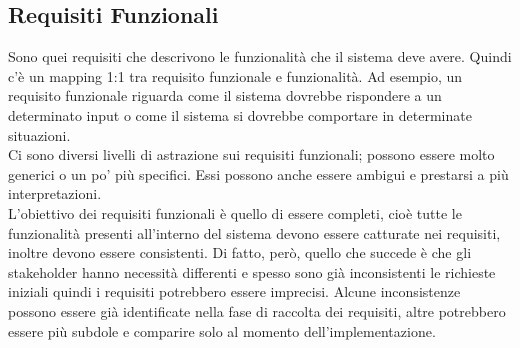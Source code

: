\subsection{Requisiti Funzionali}
Sono quei requisiti che descrivono le funzionalità che il sistema deve avere.
Quindi c'è un mapping 1:1 tra requisito funzionale e funzionalità.
Ad esempio, un requisito funzionale riguarda come il sistema dovrebbe rispondere a un determinato input o come il sistema si dovrebbe comportare in determinate situazioni.\\
Ci sono diversi livelli di astrazione sui requisiti funzionali; possono essere molto generici o un po' più specifici.
Essi possono anche essere ambigui e prestarsi a più interpretazioni.\\
L'obiettivo dei requisiti funzionali è quello di essere completi, cioè tutte le funzionalità presenti all'interno del sistema devono essere catturate nei requisiti, inoltre devono essere consistenti.
Di fatto, però, quello che succede è che gli stakeholder hanno necessità differenti e spesso sono già inconsistenti le richieste iniziali quindi i requisiti potrebbero essere imprecisi.
Alcune inconsistenze possono essere già identificate nella fase di raccolta dei requisiti, altre potrebbero essere più subdole e comparire solo al momento dell'implementazione.

